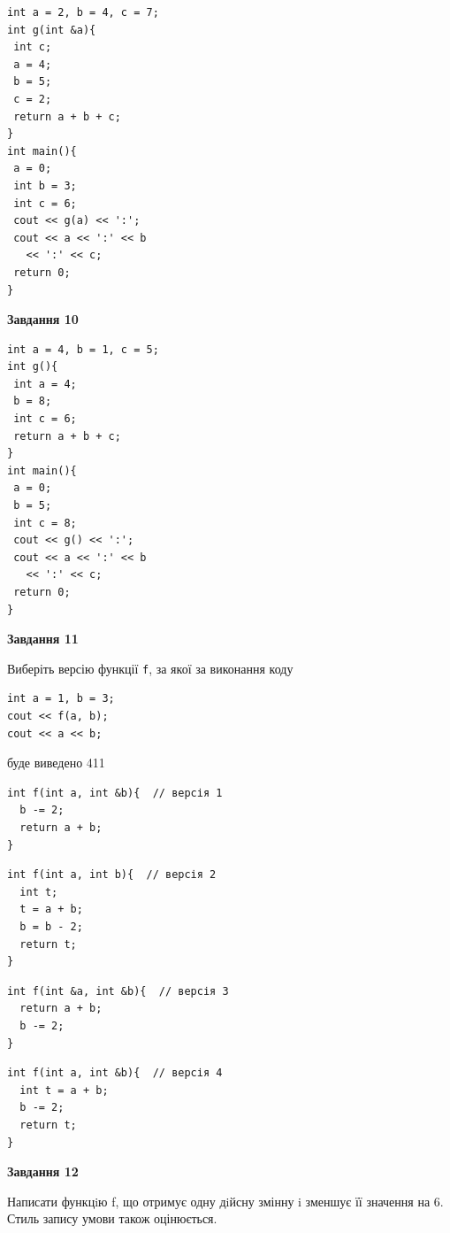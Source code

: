 \documentclass[12pt, ukrainian]{article}
\def\code#1{\Verb!#1!}
\begin{document}
{\begin {large}
\begin{minipage}[t]{7.0cm}
\begin{verbatim}
int a = 2, b = 4, c = 7;
int g(int &a){
 int c;
 a = 4;
 b = 5;
 c = 2;
 return a + b + c;
}
int main(){
 a = 0;
 int b = 3;
 int c = 6;
 cout << g(a) << ':';
 cout << a << ':' << b 
   << ':' << c;
 return 0;
}
\end{verbatim}



\begin{center}
\textbf{Завдання 10}
\end{center}
\vspace{-8mm}

\begin{verbatim}
int a = 4, b = 1, c = 5;
int g(){
 int a = 4;
 b = 8;
 int c = 6;
 return a + b + c;
}
int main(){
 a = 0;
 b = 5;
 int c = 8;
 cout << g() << ':';
 cout << a << ':' << b 
   << ':' << c;
 return 0;
}
\end{verbatim}

\end{minipage}
\vline \hspace{1mm}
\begin{minipage}[t]{11.0cm}

\begin{center}
\textbf{Завдання 11}
\end{center}
Виберіть версію функції \code{f}, за якої за виконання коду
\begin{verbatim}
int a = 1, b = 3;
cout << f(a, b);
cout << a << b;
\end{verbatim}

буде виведено 411

\begin{verbatim}
int f(int a, int &b){  // версія 1
  b -= 2;
  return a + b;
}
\end{verbatim}

\vspace{-8mm}\begin{verbatim}
int f(int a, int b){  // версія 2
  int t;
  t = a + b;
  b = b - 2;
  return t;
}
\end{verbatim}

\vspace{-8mm}\begin{verbatim}
int f(int &a, int &b){  // версія 3
  return a + b;
  b -= 2;
}
\end{verbatim}

\vspace{-8mm}\begin{verbatim}
int f(int a, int &b){  // версія 4
  int t = a + b;
  b -= 2;
  return t;
}
\end{verbatim}



\begin{center}
\textbf{Завдання 12}
\end{center}

Написати функцiю f, що отримує одну дiйсну змінну i зменшує її значення на 6. Стиль запису умови також оцінюється.\par

\end{minipage}

\end {large}}
\newpage
\end{document}
